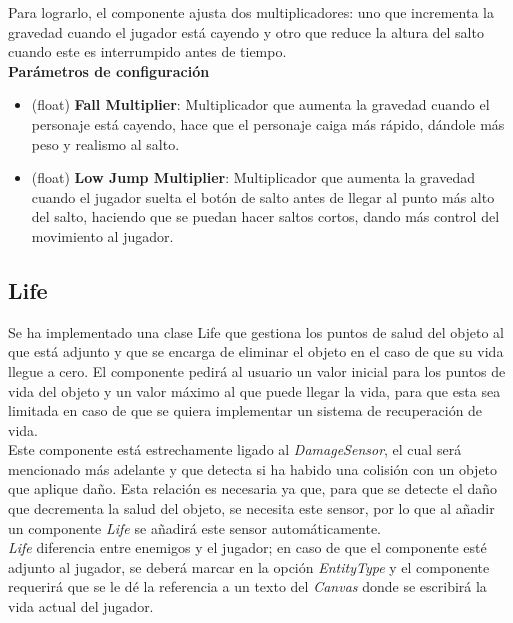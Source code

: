 Para lograrlo, el componente ajusta dos multiplicadores: uno que incrementa la gravedad cuando el jugador está cayendo y otro que reduce la altura del salto cuando este es interrumpido antes de tiempo.\\

\textbf{Parámetros de configuración}
\begin{itemize}
	\item (float) \textbf{Fall Multiplier}: Multiplicador que aumenta la gravedad cuando el personaje está cayendo, hace que el personaje caiga más rápido, dándole más peso y realismo al salto.
	\item (float) \textbf{Low Jump Multiplier}: Multiplicador que aumenta la gravedad cuando el jugador suelta el botón de salto antes de llegar al punto más alto del salto, haciendo que se puedan hacer saltos cortos, dando más control del movimiento al jugador.
\end{itemize}

\subsection{Life}

Se ha implementado una clase Life que gestiona los puntos de salud del objeto al que está adjunto y que se encarga de eliminar el objeto en el caso de que su vida llegue a cero. El componente pedirá al usuario un valor inicial para los puntos de vida del objeto y un valor máximo al que puede llegar la vida, para que esta sea limitada en caso de que se quiera implementar un sistema de recuperación de vida.\\

Este componente está estrechamente ligado al \textit{DamageSensor}, el cual será mencionado más adelante y que detecta si ha habido una colisión con un objeto que aplique daño. Esta relación es necesaria ya que, para que se detecte el daño que decrementa la salud del objeto, se necesita este sensor, por lo que al añadir un componente \textit{Life} se añadirá este sensor automáticamente.\\

\textit{Life} diferencia entre enemigos y el jugador; en caso de que el componente esté adjunto al jugador, se deberá marcar en la opción \textit{EntityType} y el componente requerirá que se le dé la referencia a un texto del \textit{Canvas} donde se escribirá la vida actual del jugador.\\

